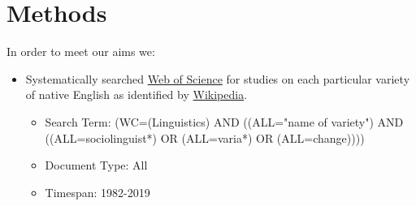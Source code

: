 \documentclass[a0paper,fleqn]{betterposter}
\begin{document}
{\section{Methods}

In order to meet our aims we:
\begin{itemize}
	\item Systematically searched \href{https://app.webofknowledge.com}{Web of Science} for studies on each particular variety of native English as identified by \href{https://en.m.wikipedia.org/wiki/List_of_dialects_of_English}{Wikipedia}.
	\begin{itemize}
		\item Search Term: (WC=(Linguistics)  AND  ((ALL="name of variety")  AND  ((ALL=sociolinguist*)  OR  (ALL=varia*)  OR  (ALL=change))))
		\item Document Type: All
		\item Timespan: 1982-2019 
	\end{itemize}
\end{itemize}
}
\end{document}
